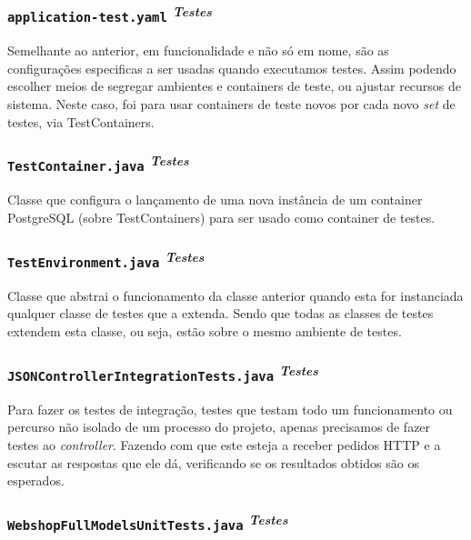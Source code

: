 \subsubsection*{\texttt{application-test.yaml} \textsuperscript{\textit{Testes}}}

Semelhante ao anterior, em funcionalidade e não só em nome, são as configurações especificas a ser usadas quando executamos testes. Assim podendo escolher meios de segregar ambientes e containers de teste, ou ajustar recursos de sistema. Neste caso, foi para usar containers de teste novos por cada novo \textit{set} de testes, via TestContainers.

\subsubsection*{\texttt{TestContainer.java} \textsuperscript{\textit{Testes}}}

Classe que configura o lançamento de uma nova instância de um container PostgreSQL (sobre TestContainers) para ser usado como container de testes.

\subsubsection*{\texttt{TestEnvironment.java} \textsuperscript{\textit{Testes}}}

Classe que abstrai o funcionamento da classe anterior quando esta for instanciada qualquer classe de testes que a extenda. Sendo que todas as classes de testes extendem esta classe, ou seja, estão sobre o mesmo ambiente de testes.

\subsubsection*{\texttt{JSONControllerIntegrationTests.java} \textsuperscript{\textit{Testes}}}

Para fazer os testes de integração, testes que testam todo um funcionamento ou percurso não isolado de um processo do projeto, apenas precisamos de fazer testes ao \textit{controller}. Fazendo com que este esteja a receber pedidos HTTP e a escutar as respostas que ele dá, verificando se os resultados obtidos são os esperados.

\subsubsection*{\texttt{WebshopFullModelsUnitTests.java} \textsuperscript{\textit{Testes}}}

